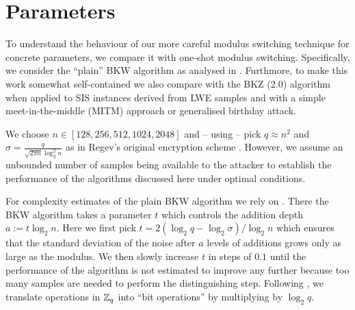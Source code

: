 \section{Parameters} \label{sec:parameters}
To understand the behaviour of our more careful modulus switching technique for concrete parameters, we compare it with one-shot modulus switching. Specifically, we consider the ``plain'' BKW algorithm \cite{blum-kalai-wasserman:acm2003} as analysed in \cite{albrecht-cid-faugere-fitzpatrick-perret:dcc2013}. Furthmore, to make this work somewhat self-contained we also compare with the BKZ (2.0) algorithm when applied to SIS instances derived from LWE samples and with a simple meet-in-the-middle (MITM) approach or generalised birthday attack.

 We choose $n \in [128,256,512,1024,2048]$ and -- using \cite{albrecht-fitzpatrick-cabracas-goepfert-schneider:bitbucket2013} -- pick $q \approx n^2$ and $\sigma = \frac{q}{\sqrt{2\pi n} \log_2^2 n}$ as in Regev's original encryption scheme \cite{regev:acm09}. 
However, we assume an unbounded number of samples being available to the attacker to establish the performance of the algorithms discussed here under optimal conditions.

For complexity estimates of the plain BKW algorithm we rely on \cite{albrecht-cid-faugere-fitzpatrick-perret:dcc2013}. There the BKW algorithm takes a parameter $t$ which controls the addition depth $a := t \log_2 n$. Here we first pick $t = 2(\log_2 q - \log_2 \sigma)/\log_2 n$ which ensures that the standard deviation of the noise after $a$ levels of additions grows only as large as the modulus. We then slowly increase $t$ in steps of $0.1$ until the performance of the algorithm is not estimated to improve any further because too many samples are needed to perform the distinguishing step. Following \cite{albrecht-cid-faugere-fitzpatrick-perret:dcc2013}, we translate operations in $\mathbb{Z}_q$ into ``bit operations'' by multiplying by $\log_2 q$.

